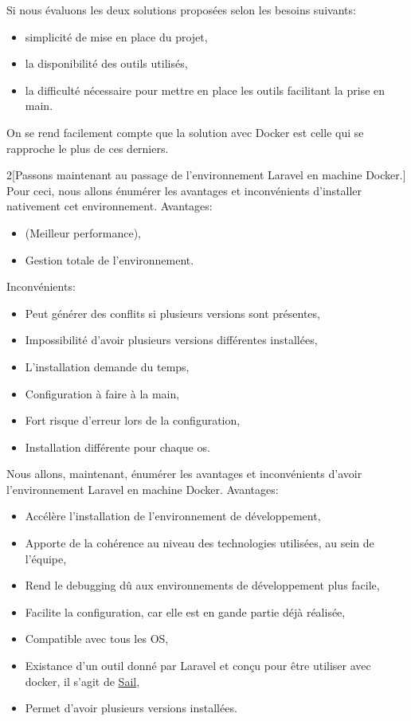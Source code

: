 \documentclass[
    iai, %
    il, %
]{heig-tb}
\begin{document}
Si nous évaluons les deux solutions proposées selon les besoins suivants:
\begin{itemize}
    \item simplicité de mise en place du projet,
    \item la disponibilité des outils utilisés,
    \item la difficulté nécessaire pour mettre en place les outils facilitant la prise en main.
\end{itemize}

On se rend facilement compte que la solution avec Docker est celle qui se rapproche le plus de ces derniers.

\begin{multicols}{2}[Passons maintenant au passage de l'environnement Laravel en machine Docker.]
    Pour ceci, nous allons énumérer les avantages et inconvénients d'installer nativement cet environnement.
    Avantages:
    \begin{itemize}
        \item (Meilleur performance),
        \item Gestion totale de l'environnement.
    \end{itemize}

    Inconvénients:
    \begin{itemize}
        \item Peut générer des conflits si plusieurs versions sont présentes,
        \item Impossibilité d'avoir plusieurs versions différentes installées,
        \item L'installation demande du temps,
        \item Configuration à faire à la main,
        \item Fort risque d'erreur lors de la configuration,
        \item Installation différente pour chaque \Gls{os}.
    \end{itemize}

    \columnbreak
    Nous allons, maintenant, énumérer les avantages et inconvénients d'avoir l'environnement Laravel en machine Docker.
    Avantages:
    \begin{itemize}
        \item Accélère l'installation de l'environnement de développement, \cite{labrecque}
        \item Apporte de la cohérence au niveau des technologies utilisées, au sein de l'équipe, \cite{labrecque, data-flair-use-cases}
        \item Rend le debugging dû aux environnements de développement plus facile, \cite{labrecque,koukia}
        \item Facilite la configuration, car elle est en gande partie déjà réalisée, \cite{data-flair-pros-cons}
        \item Compatible avec tous les OS,
        \item Existance d'un outil donné par Laravel et conçu pour être utiliser avec \Gls{docker}, il s'agit de \href{https://laravel.com/docs/9.x/sail}{Sail},
        \item Permet d'avoir plusieurs versions installées.
    \end{itemize}


\end{multicols}
\end{document}
